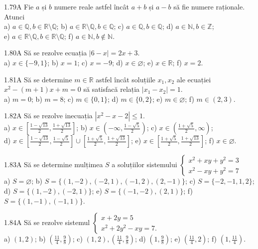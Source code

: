 \documentclass[11pt]{article}
\begin{document}
1.79A Fie $a$ și $b$ numere reale astfel încât $a+b$ și $a-b$ să fie numere raționale. Atunci\\ a) $a \in \mathbb{Q}, b \in \mathbb{R} \setminus \mathbb{Q}$; b) $a \in \mathbb{R} \setminus \mathbb{Q}, b \in \mathbb{Q}$; c) $a \in \mathbb{Q}, b \in \mathbb{Q}$; d) $a \in \mathbb{N}, b \in \mathbb{Z}$;\\ e) $a \in \mathbb{R} \setminus \mathbb{Q}, b \in \mathbb{R} \setminus \mathbb{Q}$; f) $a \in \mathbb{N}, b \notin \mathbb{N}$.

1.80A Să se rezolve ecuația $|6-x|=2 x+3$.\\ a) $x \in\{-9,1\}$; b) $x=1$; c) $x=-9$; d) $x \in \varnothing$; e) $x \in \mathbb{R}$; f) $x=2$.

1.81A Să se determine $m \in \mathbb{R}$ astfel încât soluțiile $x_{1}, x_{2}$ ale ecuației $x^{2}-(m+1) x+m=0$ să satisfacă relația $\left|x_{1}-x_{2}\right|=1$.\\ a) $m=0$; b) $m=8$; c) $m \in\{0,1\}$; d) $m \in\{0,2\}$; e) $m \in \varnothing$; f) $m \in(2,3)$.

1.82A Să se rezolve inecuația $\left|x^{2}-x-2\right| \leq 1$.\\ a) $x \in\left[\frac{1-\sqrt{13}}{2}, \frac{1+\sqrt{13}}{2}\right]$; b) $x \in\left(-\infty, \frac{1-\sqrt{5}}{2}\right)$; c) $x \in\left(\frac{1+\sqrt{5}}{2}, \infty\right)$;\\ d) $x \in\left[\frac{1-\sqrt{13}}{2}, \frac{1-\sqrt{5}}{2}\right] \cup\left[\frac{1+\sqrt{5}}{2}, \frac{1+\sqrt{13}}{2}\right]$; e) $x \in\left[\frac{1+\sqrt{5}}{2}, \frac{1+\sqrt{13}}{2}\right]$; f) $x \in \varnothing$.

1.83A Să se determine mulțimea $S$ a soluțiilor sistemului $\left\{\begin{array}{l}x^{2}+x y+y^{2}=3 \\ x^{2}-x y+y^{2}=7\end{array}\right.$\\ a) $S=\varnothing$; b) $S=\{(1,-2),(-2,1),(-1,2),(2,-1)\}$; c) $S=\{-2,-1,1,2\}$; d) $S=\{(1,-2),(-2,1)\}$; e) $S=\{(-1,-2),(2,1)\}$; f) $S=\{(1,-1),(-1,1)\}$.

1.84A Să se rezolve sistemul $\left\{\begin{array}{l}x+2 y=5 \\ x^{2}+2 y^{2}-xy=7.\end{array}\right.$\\ a) $(1,2)$; b) $\left(\frac{11}{4}, \frac{9}{8}\right)$; c) $(1,2),\left(\frac{11}{4}, \frac{9}{8}\right)$; d) $\left(1, \frac{9}{8}\right)$; e) $\left(\frac{11}{4}, 2\right)$; f) $\left(1, \frac{11}{4}\right)$.
\end{document}
